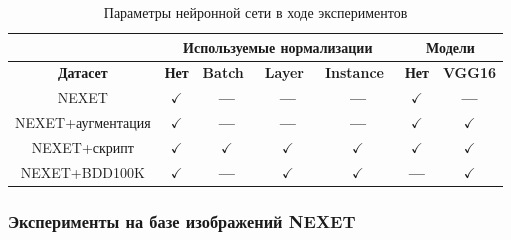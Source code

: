 \documentclass[11pt,a4paper]{extarticle}
\begin{document}
{			\begin{table}[h]
				\begin{tabular}{|c|c|c|c|c|c|c|}
					\hline
					\rowcolor[HTML]{AFD7AF} 
					\cellcolor[HTML]{EFEFEF}{\color[HTML]{CB0000} \textbf{Параметры обучения}} & \multicolumn{4}{c|}{\cellcolor[HTML]{AFD7AF}\textbf{Используемые нормализации}} & \multicolumn{2}{c|}{\cellcolor[HTML]{F7C7B1}\textbf{Модели}}     \\ \hline
					\rowcolor[HTML]{AFD7AF} 
					\cellcolor[HTML]{B6C0D0}\textbf{Датасет}                                   & \textbf{Нет}     & \textbf{Batch}~\cite{n_batch}    & \textbf{Layer}~\cite{n_layer}    & \textbf{Instance}~\cite{n_instance}    & \cellcolor[HTML]{F7C7B1}\textbf{Нет} & \cellcolor[HTML]{F7C7B1}\textbf{VGG16} \\ \hline
					\rowcolor[HTML]{EFEFEF} 
					NEXET                                                                      & $\checkmark$     & \textbf{---}      & \textbf{---}      & \textbf{---}         & $\checkmark$                         & \textbf{---}                           \\ \hline
					NEXET+аугментация                                                        & $\checkmark$     & \textbf{---}      & \textbf{---}      & \textbf{---}         & $\checkmark$                         & $\checkmark$                           \\ \hline
					\rowcolor[HTML]{EFEFEF} 
					NEXET+скрипт\footnotemark[2]                                                & $\checkmark$     & $\checkmark$      & $\checkmark$      & $\checkmark$         & $\checkmark$                         & $\checkmark$                           \\ \hline
					NEXET+BDD100K                                                              & $\checkmark$	     & \textbf{---}      & $\checkmark$        & $\checkmark$         & \textbf{---}                         & \cellcolor[HTML]{FFFFFF}$\checkmark$   \\ \hline
				\end{tabular}
				\caption{Параметры нейронной сети в ходе экспериментов}{
					\small{
					}
				}
				\label{tab:configs}
			\end{table}
			
		\subsubsection{Эксперименты на базе изображений NEXET}\label{sec:tests:nexet}

}
\end{document}
